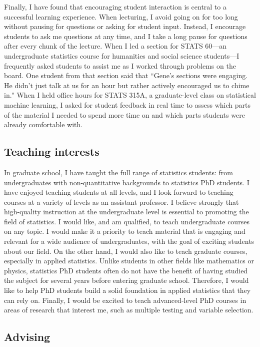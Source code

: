 \documentclass[11pt]{article}
\begin{document}
Finally, I have found that encouraging student interaction is central to a successful learning experience. When lecturing, I avoid going on for too long without pausing for questions or asking for student input. Instead, I encourage students to ask me questions at any time, and I take a long pause for questions after every chunk of the lecture. When I led a section for STATS 60---an undergraduate statistics course for humanities and social science students---I frequently asked students to assist me as I worked through problems on the board. One student from that section said that ``Gene's sections were engaging. He didn't just talk at us for an hour but rather actively encouraged us to chime in." When I held office hours for STATS 315A, a graduate-level class on statistical machine learning, I asked for student feedback in real time to assess which parts of the material I needed to spend more time on and which parts students were already comfortable with. 

\subsection*{Teaching interests}

In graduate school, I have taught the full range of statistics students: from undergraduates with non-quantitative backgrounds to statistics PhD students. I have enjoyed teaching students at all levels, and I look forward to teaching courses at a variety of levels as an assistant professor. I believe strongly that high-quality instruction at the undergraduate level is essential to promoting the field of statistics. I would like, and am qualified, to teach undergraduate courses on any topic. I would make it a priority to teach material that is engaging and relevant for a wide audience of undergraduates, with the goal of exciting students about our field. On the other hand, I would also like to teach graduate courses, especially in applied statistics. Unlike students in other fields like mathematics or physics, statistics PhD students often do not have the benefit of having studied the subject for several years before entering graduate school. Therefore, I would like to help PhD students build a solid foundation in applied statistics that they can rely on. Finally, I would be excited to teach advanced-level PhD courses in areas of research that interest me, such as multiple testing and variable selection.

\subsection*{Advising}
\end{document}
